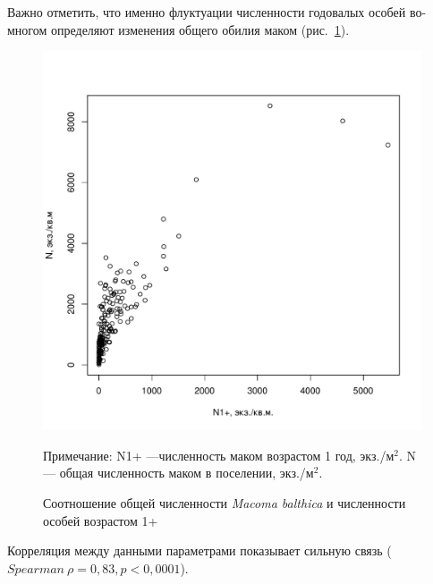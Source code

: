 Важно отметить, что именно флуктуации численности годовалых особей во-многом определяют изменения общего обилия маком (рис.~\ref{ris:N1year_vs_Nall}).
    \begin{figure}[p]
        \includegraphics[width=\textwidth]{../White_Sea/oneyear_all_Kandalaksha_all/N1y_vs_N2_1.pdf}
    \caption{Соотношение общей численности {\it Macoma balthica} и численности особей возрастом 1+}
    \label{ris:N1year_vs_Nall}

	\footnotesize{Примечание: N1+ ---численность маком возрастом 1 год, экз./м$^2$. N --- общая численность маком в поселении, экз./м$^2$.}
    \end{figure}
Корреляция между данными параметрами показывает сильную связь ($Spearman\ \rho = 0,83, p < 0,0001$).

